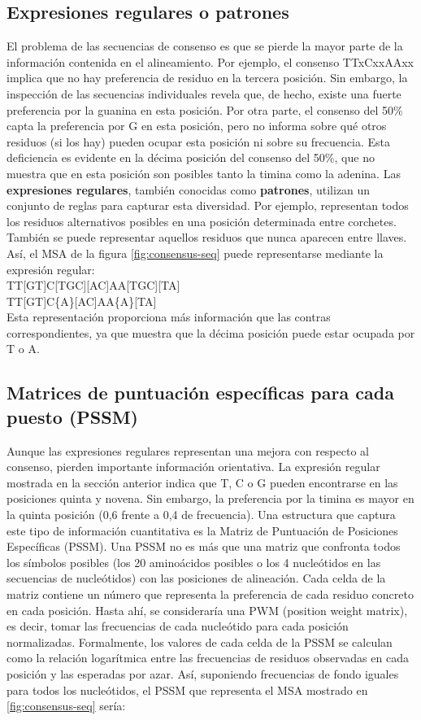 \subsection{Expresiones regulares o patrones}
El problema de las secuencias de consenso es que se pierde la mayor parte de la información contenida en el alineamiento. Por ejemplo, el consenso TTxCxxAAxx implica que no hay preferencia de residuo en la tercera posición. Sin embargo, la inspección de las secuencias individuales revela que, de hecho, existe una fuerte preferencia por la guanina en esta posición.
Por otra parte, el consenso del 50\% capta la preferencia por G en esta posición, pero no informa sobre qué otros residuos (si los hay) pueden ocupar esta posición ni sobre su frecuencia. Esta deficiencia es evidente en la décima posición del consenso del 50\%, que no muestra que en esta posición son posibles tanto la timina como la adenina. Las \textbf{expresiones regulares}, también conocidas como \textbf{patrones}, utilizan un conjunto de reglas para capturar esta diversidad. Por ejemplo, representan todos los residuos alternativos posibles en una posición determinada entre corchetes. También se puede representar aquellos residuos que nunca aparecen entre llaves. Así, el MSA de la figura \ref{fig:consensus-seq} puede representarse mediante la expresión regular:\\
TT[GT]C[TGC][AC]AA[TGC][TA]\\
TT[GT]C\{A\}[AC]AA\{A\}[TA]\\
Esta representación proporciona más información que las contras correspondientes, ya que muestra que la décima posición puede estar ocupada por T o A.

\subsection{Matrices de puntuación específicas para cada puesto (PSSM)}
Aunque las expresiones regulares representan una mejora con respecto al consenso, pierden importante información orientativa. La expresión regular mostrada en la sección anterior indica que T, C o G pueden encontrarse en las posiciones quinta y novena. Sin embargo, la preferencia por la timina es mayor en la quinta posición (0,6 frente a 0,4 de frecuencia). Una estructura que captura este tipo de información cuantitativa es la Matriz de Puntuación de Posiciones Específicas (PSSM). Una PSSM no es más que una matriz que confronta todos los símbolos posibles (los 20 aminoácidos posibles o los 4 nucleótidos en las secuencias de nucleótidos) con las posiciones de alineación. Cada celda de la matriz contiene un número que representa la preferencia de cada residuo concreto en cada posición. Hasta ahí, se consideraría una PWM (position weight matrix), es decir, tomar las frecuencias de cada nucleótido para cada posición normalizadas. Formalmente, los valores de cada celda de la PSSM se calculan como la relación logarítmica entre las frecuencias de residuos observadas en cada posición y las esperadas por azar. Así, suponiendo frecuencias de fondo iguales para todos los nucleótidos, el PSSM que representa el MSA mostrado en \ref{fig:consensus-seq} sería:

